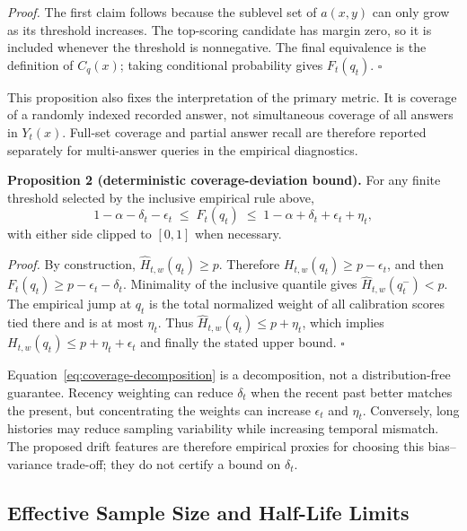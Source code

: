 \emph{Proof.}
The first claim follows because the sublevel set of \(a(x,y)\) can only grow as
its threshold increases.  The top-scoring candidate has margin zero, so it is
included whenever the threshold is nonnegative.  The final equivalence is the
definition of \(C_q(x)\); taking conditional probability gives \(F_t(q_t)\).
\hfill\(\square\)

This proposition also fixes the interpretation of the primary metric.  It is
coverage of a randomly indexed recorded answer, not simultaneous coverage of
all answers in \(Y_t(x)\).  Full-set coverage and partial answer recall are
therefore reported separately for multi-answer queries in the empirical
diagnostics.

\noindent\textbf{Proposition 2 (deterministic coverage-deviation bound).}\quad
For any finite threshold selected by the inclusive empirical rule above,
\[
  1-\alpha-\delta_t-\epsilon_t
  \;\leq\;F_t(q_t)\;\leq\;
  1-\alpha+\delta_t+\epsilon_t+\eta_t,
  \tag{1}\label{eq:coverage-decomposition}
\]
with either side clipped to \([0,1]\) when necessary.

\emph{Proof.}
By construction, \(\widehat H_{t,w}(q_t)\geq p\).  Therefore
\(H_{t,w}(q_t)\geq p-\epsilon_t\), and then
\(F_t(q_t)\geq p-\epsilon_t-\delta_t\).  Minimality of the inclusive quantile
gives \(\widehat H_{t,w}(q_t^-)<p\).  The empirical jump at \(q_t\) is the
total normalized weight of all calibration scores tied there and is at most
\(\eta_t\).  Thus
\(\widehat H_{t,w}(q_t)\leq p+\eta_t\), which implies
\(H_{t,w}(q_t)\leq p+\eta_t+\epsilon_t\) and finally the stated upper bound.
\hfill\(\square\)

Equation~\eqref{eq:coverage-decomposition} is a decomposition, not a
distribution-free guarantee.  Recency weighting can reduce \(\delta_t\) when
the recent past better matches the present, but concentrating the weights can
increase \(\epsilon_t\) and \(\eta_t\).  Conversely, long histories may reduce
sampling variability while increasing temporal mismatch.  The proposed drift
features are therefore empirical proxies for choosing this bias--variance
trade-off; they do not certify a bound on \(\delta_t\).

\subsection{Effective Sample Size and Half-Life Limits}

